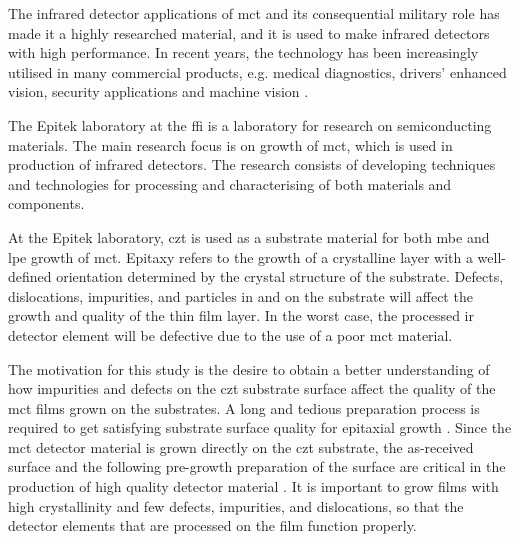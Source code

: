 The infrared detector applications of \ac{mct} and its consequential military role has made it a highly researched material, and it is used to make infrared detectors with high performance. In recent years, the technology has been increasingly utilised in many commercial products, e.g. medical diagnostics, drivers' enhanced vision, security applications and machine vision \citep{dhar2013advances}.

The Epitek laboratory at the \ac{ffi} is a laboratory for research on semiconducting materials. The main research focus is on growth of \ac{mct}, which is used in production of infrared detectors. The research consists of developing techniques and technologies for processing and characterising of both materials and components.

At the Epitek laboratory, \ac{czt} is used as a substrate material for both \ac{mbe} and \ac{lpe} growth of \ac{mct}. Epitaxy refers to the growth of a crystalline layer with a well-defined orientation determined by the crystal structure of the substrate. Defects, dislocations, impurities, and particles in and on the substrate will affect the growth and quality of the thin film layer. In the worst case, the processed \ac{ir} detector element will be defective due to the use of a poor \ac{mct} material. %

The motivation for this study is the desire to obtain a better understanding of how impurities and defects on the \ac{czt} substrate surface affect the quality of the \ac{mct} films grown on the substrates. A long and tedious preparation process is required to get satisfying substrate surface quality for epitaxial growth \citep{triboulet2009cdteI}. Since the \ac{mct} detector material is grown directly on the \ac{czt} substrate, the as-received surface and the following pre-growth preparation of the surface are critical in the production of high quality detector material \citep{benson2015as-received}. It is important to grow films with high crystallinity and few defects, impurities, and dislocations, so that the detector elements that are processed on the film function properly.

